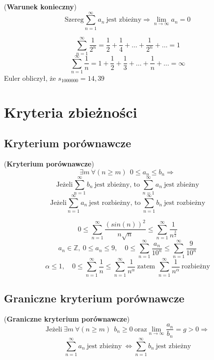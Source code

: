 \begin{df}{(\textbf{Warunek konieczny})}
$$\text{Szereg} \sum_{n=1}^{\infty}a_{n}\ \text{jest zbieżny} \Rightarrow \lim_{n \to \infty} a_n=0$$
\end{df}
\begin{przyk}
$$\sum_{n=1}^{\infty}\frac{1}{2^n}=\frac{1}{2}+\frac{1}{4}+\ldots+\frac{1}{2^n}+\ldots=1$$
$$\sum_{n=1}^{\infty}\frac{1}{n}=1+\frac{1}{2}+\frac{1}{3}+\ldots+\frac{1}{n}+\ldots=\infty$$
Euler obliczył, że $s_{1000000}=14,39$
\end{przyk}

\section{Kryteria zbieżności}

\subsection{Kryterium porównawcze}

\begin{df}{(\textbf{Kryterium porównawcze})}
$$\exists m\ \forall (n\geq m) \ \ 0\leq a_n \leq b_n \Rightarrow $$ 
$$\text{Jeżeli} \sum_{n=1}^{\infty}b_n\ \text{jest zbieżny, to}\ \sum_{n=1}^{\infty}a_n\ \text{jest zbieżny}$$
$$\text{Jeżeli} \sum_{n=1}^{\infty}a_n\ \text{jest rozbieżny, to}\ \sum_{n=1}^{\infty}b_n\ \text{jest rozbieżny}$$
\end{df}

\begin{przyk}
$$0\leq\sum_{n=1}^{\infty} \frac{(sin(n))^2}{n\sqrt{n}} \leq \sum_{n=1}^{\infty} \frac{1}{n^{\frac{3}{2}}}$$
$$a_n\in\mathbb{Z},\ 0\leq a_n \leq 9, \quad 0\leq\sum_{n=1}^{\infty} \frac{a_n}{10^n} \leq \sum_{n=1}^{\infty} \frac{9}{10^n}$$
$$\alpha\leq 1, \quad 0\leq\sum_{n=1}^{\infty} \frac{1}{n} \leq  \sum_{n=1}^{\infty} \frac{1}{n^\alpha}\ \text{zatem } \sum_{n=1}^{\infty} \frac{1}{n^\alpha}\ \text{rozbieżny}$$
\end{przyk}

\subsection{Graniczne kryterium porównawcze}

\begin{df}{(\textbf{Graniczne kryterium porównawcze})}
$$\text{Jeżeli} \ \exists m\ \forall (n\geq m) \ \ b_n\geq 0 \ \text{oraz} \lim_{n \to \infty} \frac{a_n}{b_n}=g>0 \Rightarrow $$ 
$$\sum_{n=1}^{\infty}a_n\ \text{jest zbieżny}\ \Leftrightarrow \sum_{n=1}^{\infty}b_n\ \text{jest zbieżny}$$
\end{df}

